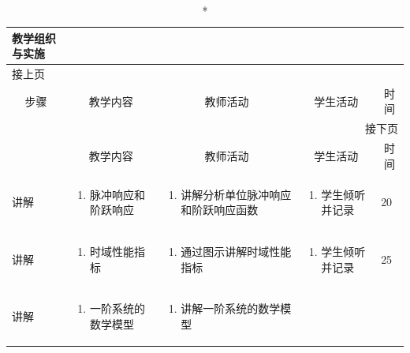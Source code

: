 {%
\begin{landscape}

\begin{longtable}{|m{10mm}|m{50mm}|m{50mm}|m{50mm}|m{15mm}|}
\caption*{\huge 教学组织与实施}\\
\hline
\endfirsthead
\multicolumn{5}{l}{\small 接上页}\\
\hline
\multicolumn{1}{|c|}{步骤}&\multicolumn{1}{c|}{教学内容}&\multicolumn{1}{c|}{教师活动}&\multicolumn{1}{c|}{学生活动}&\multicolumn{1}{c|}{时间}\\
\hline
\endhead

\multicolumn{5}{r}{\small 接下页}\\
\endfoot
\hline
\endlastfoot
\multicolumn{1}{|c|}{步骤}&\multicolumn{1}{c|}{教学内容}&\multicolumn{1}{c|}{教师活动}&\multicolumn{1}{c|}{学生活动}&\multicolumn{1}{c|}{时间}\\\hline
讲解&\begin{enumerate}
\item 脉冲响应和阶跃响应
\end{enumerate} &\begin{enumerate}
\item 讲解分析单位脉冲响应和阶跃响应函数
\end{enumerate} &\begin{enumerate}
\item 学生倾听并记录
\end{enumerate} &20 \\\hline
讲解&\begin{enumerate}
\item 时域性能指标
\end{enumerate}
 &\begin{enumerate}
\item 通过图示讲解时域性能指标
\end{enumerate} &\begin{enumerate}
\item 学生倾听并记录
\end{enumerate} &25 \\\hline
讲解&\begin{enumerate}
\item 一阶系统的数学模型
\end{enumerate}
&\begin{enumerate}
\item 讲解一阶系统的数学模型
\end{enumerate} &\begin{enumerate}

\end{enumerate}
\end{longtable}
\end{landscape}}
